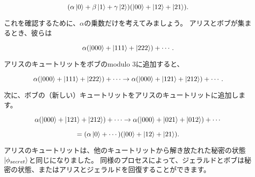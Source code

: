 \begin{equation}
\label{229}
(\alpha \ket{0} + \beta \ket{1} + \gamma \ket{2})
(\ket{00} + \ket{12} + \ket{21}).
\end{equation}

これを確認するために、$\alpha$の乗数だけを考えてみましょう。 アリスとボブが集まるとき、彼らは

\begin{equation}
\label{230}
\alpha (\ket{000} + \ket{111} + \ket{222}) + \cdots .
\end{equation}

アリスのキュートリットをボブのmodulo 3に追加すると、

\begin{equation}
\label{231}
\alpha (\ket{000} + \ket{111} + \ket{222}) + \cdots 
\to
\alpha (\ket{000} + \ket{121} + \ket{212}) + \cdots .
\end{equation}

次に、ボブの（新しい）キュートリットをアリスのキュートリットに追加します。

\begin{equation}
\label{232}
\alpha (\ket{000} + \ket{121} + \ket{212}) + \cdots 
\to
\alpha (\ket{000} + \ket{021} + \ket{012}) + \cdots 
\end{equation}

\begin{equation}
\label{233}
=
(\alpha \ket{0} + \cdots )(\ket{00} + \ket{12} + \ket{21}). 
\end{equation}



アリスのキュートリットは、他のキュートリットから解き放たれた秘密の状態$\ket{\phi_{secret}} $と同じになりました。 同様のプロセスによって、ジェラルドとボブは秘密の状態、またはアリスとジェラルドを回復することができます。
